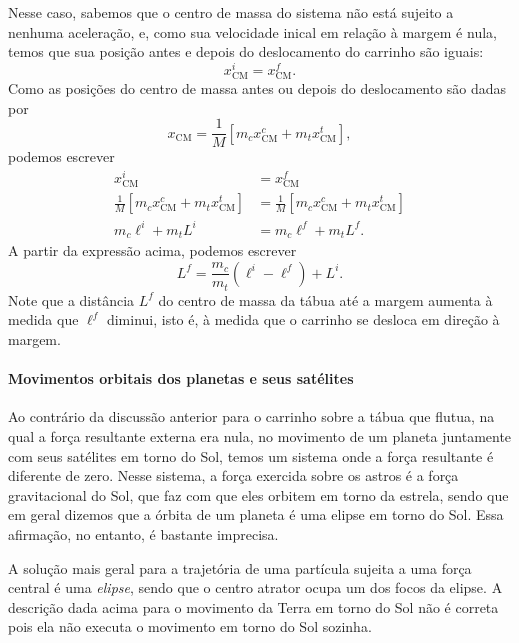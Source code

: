 Nesse caso, sabemos que o centro de massa do sistema não está sujeito a nenhuma aceleração, e, como sua velocidade inical em relação à margem é nula, temos que sua posição antes e depois do deslocamento do carrinho são iguais:
\begin{equation}
    x_{\text{CM}}^i = x_{\textrm{CM}}^f.
\end{equation}
%
Como as posições do centro de massa antes ou depois do deslocamento são dadas por
\begin{equation}
    x_{\text{CM}} = \frac{1}{M} [m_c x_{\text{CM}}^{c} + m_t x_{\text{CM}}^t],
\end{equation}
%
podemos escrever
\begin{align}
    x_{\text{CM}}^i &= x_{\textrm{CM}}^f \\
    \frac{1}{M} [m_c x_{\text{CM}}^{c} + m_t x_{\text{CM}}^t] &= \frac{1}{M} [m_c x_{\text{CM}}^{c} + m_t x_{\text{CM}}^t] \\
    m_c \ell^i + m_t L^i &= m_c \ell^f + m_t L^f.
\end{align}
%
A partir da expressão acima, podemos escrever
\begin{equation}
    L^f = \frac{m_c}{m_t}(\ell^i - \ell^f) + L^i.
\end{equation}
%
Note que a distância $L^f$ do centro de massa da tábua até a margem aumenta à medida que $\ell^f$ diminui, isto é, à medida que o carrinho se desloca em direção à margem.

\paragraph{Movimentos orbitais dos planetas e seus satélites}

Ao contrário da discussão anterior para o carrinho sobre a tábua que flutua, na qual a força resultante externa era nula, no movimento de um planeta juntamente com seus satélites em torno do Sol, temos um sistema onde a força resultante é diferente de zero. Nesse sistema, a força exercida sobre os astros é a força gravitacional do Sol, que faz com que eles orbitem em torno da estrela, sendo que em geral dizemos que a órbita de um planeta é uma elipse em torno do Sol. Essa afirmação, no entanto, é bastante imprecisa.

A solução mais geral para a trajetória de uma partícula sujeita a uma força central é uma \emph{elipse}, sendo que o centro atrator ocupa um dos focos da elipse. A descrição dada acima para o movimento da Terra em torno do Sol não é correta pois ela não executa o movimento em torno do Sol sozinha.


